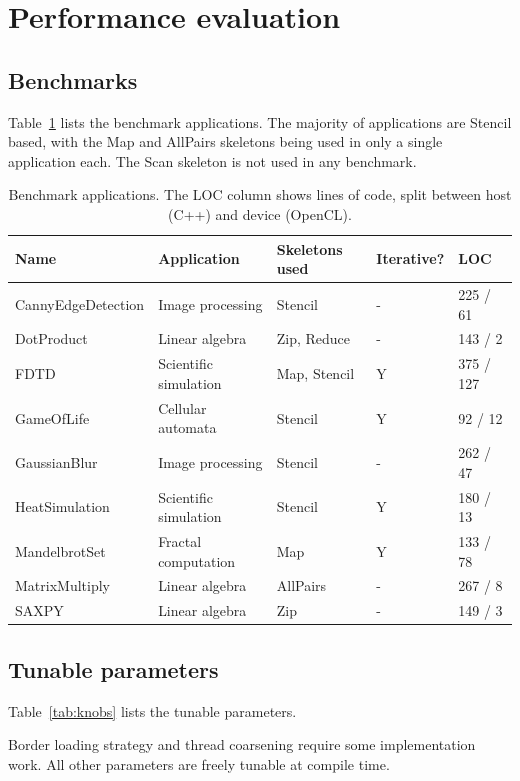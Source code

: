 \section{Performance evaluation}

\subsection{Benchmarks}

Table~\ref{tab:benchmarks} lists the benchmark applications. The
majority of applications are Stencil based, with the Map and AllPairs
skeletons being used in only a single application each. The Scan
skeleton is not used in any benchmark.

\begin{table}
\footnotesize
\centering
\begin{tabular}{| l | l | l | l | l |}
\hline
\textbf{Name} & \textbf{Application} & \textbf{Skeletons used} & \textbf{Iterative?} & \textbf{LOC}\\
\hline
CannyEdgeDetection & Image processing & Stencil & - & 225 / 61\\
DotProduct & Linear algebra & Zip, Reduce & - & 143 / 2\\
FDTD & Scientific simulation & Map, Stencil & Y & 375 / 127\\
GameOfLife & Cellular automata & Stencil & Y & 92 / 12\\
GaussianBlur & Image processing & Stencil & - & 262 / 47\\
HeatSimulation & Scientific simulation & Stencil & Y & 180 / 13\\
MandelbrotSet & Fractal computation & Map & Y & 133 / 78\\
MatrixMultiply & Linear algebra & AllPairs & - & 267 / 8\\
SAXPY & Linear algebra & Zip & - & 149 / 3\\
\hline
\end{tabular}
\caption{Benchmark applications. The LOC column shows lines of code, split between host (C++) and device (OpenCL).}
\label{tab:benchmarks}
\end{table}

\subsection{Tunable parameters}

Table~\ref{tab:knobs} lists the tunable parameters.

Border loading strategy and thread coarsening require some
implementation work. All other parameters are freely tunable at
compile time.

